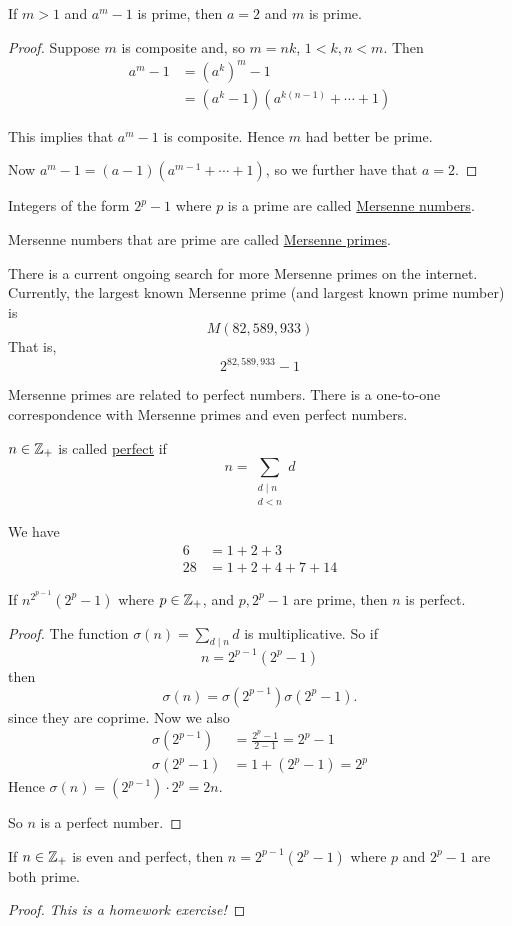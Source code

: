 \begin{lemma}
	If $m>1$ and $a^m - 1$ is prime, then $a=2$ and $m$ is prime.
\end{lemma}
\begin{proof}
	Suppose $m$ is composite and, so $m=nk$, $1 < k, n < m$. Then
	\begin{align*}
		a^m - 1 & = (a^k)^m - 1                        \\
		        & = (a^k - 1)(a^{k(n-1)} + \cdots + 1)
	\end{align*}

	This implies that $a^m - 1$ is composite. Hence $m$ had better be prime.

	Now $a^m - 1 = (a-1)(a^{m-1} + \cdots + 1)$, so we further have that $a = 2$.
\end{proof}
\begin{definition}
	Integers of the form $2^p - 1$ where $p$ is a prime are called \ul{Mersenne numbers}.

	Mersenne numbers that are prime are called \ul{Mersenne primes}.
\end{definition}
There is a current ongoing search for more Mersenne primes on the internet. Currently, the largest known Mersenne prime (and largest known prime number) is
\[M(82,589,933)\]
That is,
\[2^{82,589,933} - 1\]

Mersenne primes are related to perfect numbers. There is a one-to-one correspondence with Mersenne primes and even perfect numbers.
\begin{definition}
	$n\in\mathbb Z_+$ is called \ul{perfect} if
	\[n = \sum_{\substack{d\mid n \\ d < n}} d\]
\end{definition}
\begin{example}
	We have
	\begin{align*}
		6  & = 1 + 2 + 3          \\
		28 & = 1 + 2 + 4 + 7 + 14
	\end{align*}
\end{example}
\begin{proposition}
	If $n^{2^{p-1}}(2^p - 1)$ where $p\in \mathbb Z_+$, and $p, 2^p - 1$ are prime, then $n$ is perfect.
\end{proposition}
\begin{proof}
	The function $\sigma(n) = \sum_{d\mid n} d$ is multiplicative. So if
	\[n = 2^{p-1}(2^p - 1)\]
	then
	\[\sigma(n) = \sigma(2^{p-1})\sigma(2^p - 1).\]
	since they are coprime. Now we also
	\begin{align*}
		\sigma(2^{p-1}) & = \frac{2^p - 1}{2 - 1} = 2^{p} - 1 \\
		\sigma(2^p - 1) & = 1 + (2^p - 1) = 2^p
	\end{align*}
	Hence $\sigma(n) = (2^{p-1})\cdot 2^p = 2n$.

	So $n$ is a perfect number.
\end{proof}
\begin{proposition}
	If $n\in \mathbb Z_+$ is even and perfect, then $n = 2^{p-1}(2^p - 1)$ where $p$ and $2^p - 1$ are both prime.
\end{proposition}
\begin{proof}
	\emph{This is a homework exercise!}
\end{proof}

